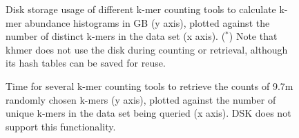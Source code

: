 \documentclass{article}
\begin{document}
\begin{figure}
\caption{Disk storage usage of different k-mer counting tools to calculate k-mer abundance histograms in GB (y axis),
plotted against the number of distinct k-mers in the data set (x axis).  ($^*$) Note that khmer does not use the disk during counting or retrieval, although its hash tables can be saved for reuse.}
\label{cmp_disk}
\end{figure}

\begin{figure}
\caption{Time for several k-mer counting tools to retrieve the counts of 9.7m randomly chosen k-mers (y axis), plotted against the number of unique k-mers in the data set being queried (x axis).  DSK does not support this functionality.}
\label{cmp_count}
\end{figure}
\end{document}
